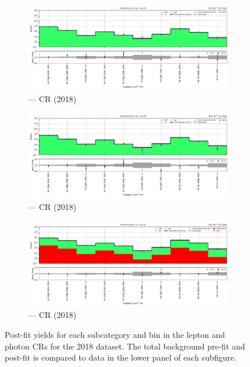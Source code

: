 \begin{figure}[htbp]
    \begin{subfigure}[b]{0.49\textwidth}
        \includegraphics[width=\textwidth]{chapters/higgstoinv/figures/mountain_ranges/2018/VH/Zmumu_tree_fit_b-abs_values_VH_cats.pdf}
        \caption{\VH --- \doubleMuCr \gls{CR} (2018)}
    \end{subfigure}
    \hfill
    \begin{subfigure}[b]{0.49\textwidth}
        \includegraphics[width=\textwidth]{chapters/higgstoinv/figures/mountain_ranges/2018/VH/Zee_tree_fit_b-abs_values_VH_cats.pdf}
        \caption{\VH --- \doubleEleCr \gls{CR} (2018)}
    \end{subfigure}

    \begin{subfigure}[b]{0.49\textwidth}
        \includegraphics[width=\textwidth]{chapters/higgstoinv/figures/mountain_ranges/2018/VH/Photon_tree_fit_b-abs_values_VH_cats.pdf}
        \caption{\VH --- \singlePhotonCr \gls{CR} (2018)}
    \end{subfigure}
    \caption[Post-fit yields for each \VH subcategory and \ptmiss bin in the lepton and photon control regions for the 2018 dataset]{Post-fit yields for each \VH subcategory and \ptmiss bin in the lepton and photon \glspl{CR} for the 2018 dataset. The total background pre-fit and post-fit is compared to data in the lower panel of each subfigure.}
    \label{fig:htoinv_mountain_range_VH_2018_CRs}
\end{figure}

